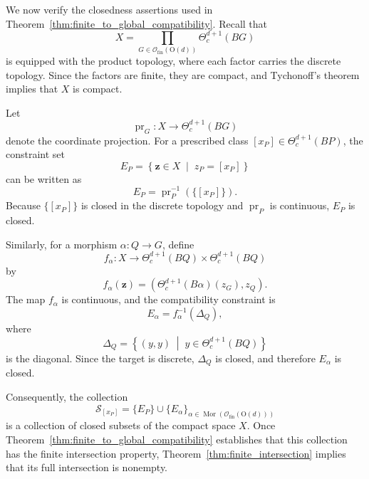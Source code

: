 \documentclass[aps,prx,reprint,superscriptaddress,twocolumn,amsmath,amssymb,amsfonts, nofootinbib]{revtex4-2}
\newcommand{\ofin}{\mathcal{O}_{\text{fin}}}
\theoremstyle{apsstyle}
\begin{document}
\bigskip

We now verify the closedness assertions used in
Theorem~\ref{thm:finite_to_global_compatibility}. Recall that
\begin{equation*}
X=
\prod_{G\in\ofin(\mathrm{O}(d))}
\Theta^{d+1}_{c}(BG)
\end{equation*}
is equipped with the product topology, where each factor carries the
discrete topology. Since the factors are finite, they are compact, and
Tychonoff's theorem implies that $X$ is compact.

\medskip 

\noindent Let
\begin{equation*}
\operatorname{pr}_G:
X\longrightarrow\Theta^{d+1}_{c}(BG)
\end{equation*}
denote the coordinate projection. For a prescribed class
$[x_P]\in\Theta^{d+1}_{c}(BP)$, the constraint set
\begin{equation*}
E_P=
\left\{
\mathbf z\in X\;\middle|\;z_P=[x_P]
\right\}
\end{equation*}
can be written as
\begin{equation*}
E_P=\operatorname{pr}_P^{-1}(\{[x_P]\}).
\end{equation*}
Because $\{[x_P]\}$ is closed in the discrete topology and
$\operatorname{pr}_P$ is continuous, $E_P$ is closed.

\medskip

\noindent Similarly, for a morphism $\alpha:Q\to G$, define
\begin{equation*}
f_\alpha:
X\longrightarrow
\Theta^{d+1}_{c}(BQ)\times\Theta^{d+1}_{c}(BQ)
\end{equation*}
by
\begin{equation*}
f_\alpha(\mathbf z)
=
\left(
\Theta^{d+1}_{c}(B\alpha)(z_G),z_Q
\right).
\end{equation*}
The map $f_\alpha$ is continuous, and the compatibility constraint is
\begin{equation*}
E_\alpha
=
f_\alpha^{-1}(\Delta_Q),
\end{equation*}
where
\begin{equation*}
\Delta_Q
=
\left\{
(y,y)\;\middle|\;
y\in\Theta^{d+1}_{c}(BQ)
\right\}
\end{equation*}
is the diagonal. Since the target is discrete, $\Delta_Q$ is closed, and therefore $E_\alpha$ is closed.

\noindent Consequently, the collection
\begin{equation*}
\mathcal S_{[x_P]}
=
\{E_P\}
\cup
\{E_\alpha\}_{\alpha\in\operatorname{Mor}(\ofin(\mathrm{O}(d)))}
\end{equation*}
is a collection of closed subsets of the compact space $X$. Once Theorem~\ref{thm:finite_to_global_compatibility} establishes that this collection has the finite intersection property, Theorem~\ref{thm:finite_intersection} implies that its full intersection is nonempty.
\end{document}
